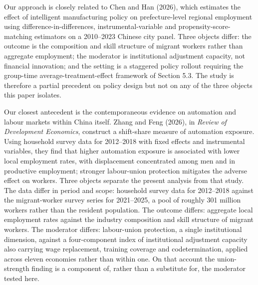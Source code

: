 \documentclass[12pt]{article}
\begin{document}
Our approach is closely related to Chen and Han (2026), which estimates the effect of intelligent manufacturing policy on prefecture-level regional employment using difference-in-differences, instrumental-variable and propensity-score-matching estimators on a 2010--2023 Chinese city panel. Three objects differ: the outcome is the composition and skill structure of migrant workers rather than aggregate employment; the moderator is institutional adjustment capacity, not financial innovation; and the setting is a staggered policy rollout requiring the group-time average-treatment-effect framework of Section 5.3. The study is therefore a partial precedent on policy design but not on any of the three objects this paper isolates.

Our closest antecedent is the contemporaneous evidence on automation and labour markets within China itself. Zhang and Feng (2026), in \emph{Review of Development Economics}, construct a shift-share measure of automation exposure. Using household survey data for 2012--2018 with fixed effects and instrumental variables, they find that higher automation exposure is associated with lower local employment rates, with displacement concentrated among men and in productive employment; stronger labour-union protection mitigates the adverse effect on workers. Three objects separate the present analysis from that study. The data differ in period and scope: household survey data for 2012--2018 against the migrant-worker survey series for 2021--2025, a pool of roughly 301 million workers rather than the resident population. The outcome differs: aggregate local employment rates against the industry composition and skill structure of migrant workers. The moderator differs: labour-union protection, a single institutional dimension, against a four-component index of institutional adjustment capacity also carrying wage replacement, training coverage and codetermination, applied across eleven economies rather than within one. On that account the union-strength finding is a component of, rather than a substitute for, the moderator tested here.
\end{document}
